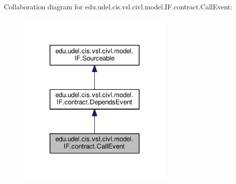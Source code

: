 Collaboration diagram for edu.\+udel.\+cis.\+vsl.\+civl.\+model.\+I\+F.\+contract.\+Call\+Event\+:
\nopagebreak
\begin{figure}[H]
\begin{center}
\leavevmode
\includegraphics[width=215pt]{interfaceedu_1_1udel_1_1cis_1_1vsl_1_1civl_1_1model_1_1IF_1_1contract_1_1CallEvent__coll__graph}
\end{center}
\end{figure}
